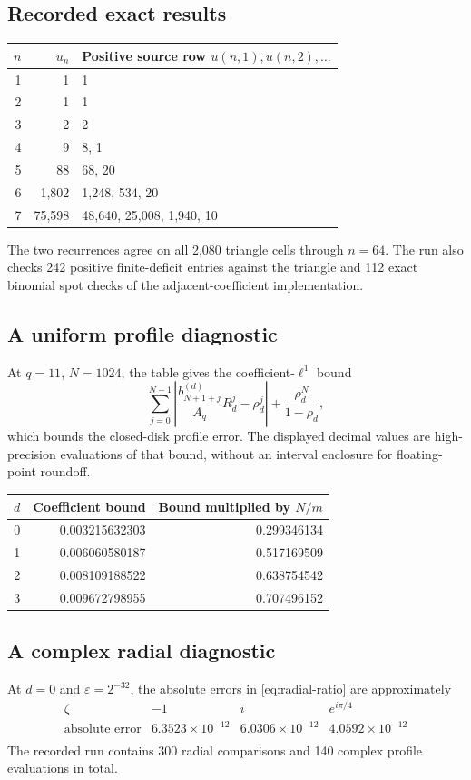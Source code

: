 \subsection{Recorded exact results}
\begin{center}
\begin{tabular}{@{}rrl@{}}
\toprule
\(n\) & \(u_n\) & Positive source row \(u(n,1),u(n,2),\ldots\) \\
\midrule
1 & 1 & 1 \\
2 & 1 & 1 \\
3 & 2 & 2 \\
4 & 9 & 8, 1 \\
5 & 88 & 68, 20 \\
6 & 1,802 & 1,248, 534, 20 \\
7 & 75,598 & 48,640, 25,008, 1,940, 10 \\
\bottomrule
\end{tabular}
\end{center}

The two recurrences agree on all 2,080 triangle cells through \(n=64\). The run also checks 242 positive finite-deficit entries against the triangle and 112 exact binomial spot checks of the adjacent-coefficient implementation.

\subsection{A uniform profile diagnostic}
At \(q=11\), \(N=1024\), the table gives the coefficient-\(\ell^1\)
bound
\[
 \sum_{j=0}^{N-1}
 \left|\frac{b_{N+1+j}^{(d)}}{A_q}R_d^j-\rho_d^j\right|
 +\frac{\rho_d^N}{1-\rho_d},
\]
which bounds the closed-disk profile error. The displayed decimal
values are high-precision evaluations of that bound, without an
interval enclosure for floating-point roundoff.
\begin{center}
\begin{tabular}{@{}rrr@{}}
\toprule
\(d\) & Coefficient bound & Bound multiplied by \(N/m\) \\
\midrule
0 & 0.003215632303 & 0.299346134 \\
1 & 0.006060580187 & 0.517169509 \\
2 & 0.008109188522 & 0.638754542 \\
3 & 0.009672798955 & 0.707496152 \\
\bottomrule
\end{tabular}
\end{center}

\subsection{A complex radial diagnostic}
At \(d=0\) and \(\varepsilon=2^{-32}\), the absolute errors in
\eqref{eq:radial-ratio} are approximately
\[
 \begin{array}{c|ccc}
 \zeta & -1 & i & e^{i\pi/4}\\ \hline
 \text{absolute error} & 6.3523\times10^{-12} & 6.0306\times10^{-12} & 4.0592\times10^{-12}\\
 \end{array}
\]
The recorded run contains 300 radial comparisons and 140 complex profile evaluations in total.
